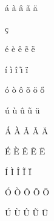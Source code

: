 \documentclass[12pt,a4paper]{article}
\begin{document}
\'{a}
\`{a}
\^{a}
\~{a}
\"{a}

\c{c}

\'{e}
\`{e}
\^{e}
\~{e}
\"{e}

\'{i}
\`{i}
\^{i}
\~{\i}
\"{i}

\'{o}
\`{o}
\^{o}
\~{o}
\"{o}
\H{o}

\'{u}
\`{u}
\^{u}
\~{u}
\"{u}

\'{A}
\`{A}
\^{A}
\~{A}
\"{A}

\'{E}
\`{E}
\^{E}
\~{E}
\"{E}

\'{I}
\`{I}
\^{I}
\~{I}
\"{I}

\'{O}
\`{O}
\^{O}
\~{O}
\"{O}

\'{U}
\`{U}
\^{U}
\~{U}
\"{U}
\end{document}

